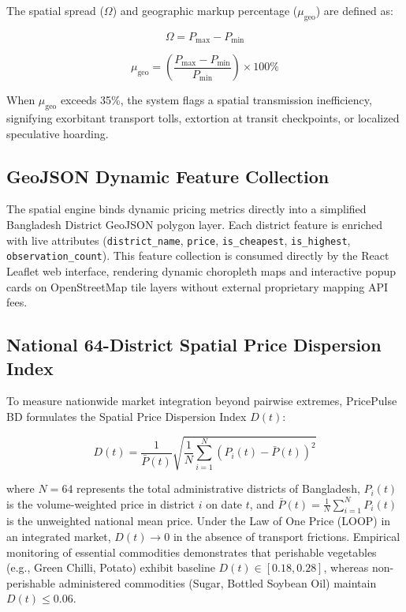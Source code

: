The spatial spread ($\Omega$) and geographic markup percentage ($\mu_{\text{geo}}$) are defined as:

\begin{equation}
\Omega = P_{\max} - P_{\min}
\end{equation}

\begin{equation}
\mu_{\text{geo}} = \left( \frac{P_{\max} - P_{\min}}{P_{\min}} \right) \times 100\%
\end{equation}

When $\mu_{\text{geo}}$ exceeds 35\%, the system flags a spatial transmission inefficiency, signifying exorbitant transport tolls, extortion at transit checkpoints, or localized speculative hoarding.

\subsection{GeoJSON Dynamic Feature Collection}
The spatial engine binds dynamic pricing metrics directly into a simplified Bangladesh District GeoJSON polygon layer. Each district feature is enriched with live attributes (\texttt{district\_name}, \texttt{price}, \texttt{is\_cheapest}, \texttt{is\_highest}, \texttt{observation\_count}). This feature collection is consumed directly by the React Leaflet web interface, rendering dynamic choropleth maps and interactive popup cards on OpenStreetMap tile layers without external proprietary mapping API fees.

\subsection{National 64-District Spatial Price Dispersion Index}
To measure nationwide market integration beyond pairwise extremes, PricePulse BD formulates the Spatial Price Dispersion Index $D(t)$:

\begin{equation}
D(t) = \frac{1}{\bar{P}(t)} \sqrt{\frac{1}{N} \sum_{i=1}^{N} \left( P_i(t) - \bar{P}(t) \right)^2}
\end{equation}

where $N = 64$ represents the total administrative districts of Bangladesh, $P_i(t)$ is the volume-weighted price in district $i$ on date $t$, and $\bar{P}(t) = \frac{1}{N} \sum_{i=1}^{N} P_i(t)$ is the unweighted national mean price. Under the Law of One Price (LOOP) in an integrated market, $D(t) \to 0$ in the absence of transport frictions. Empirical monitoring of essential commodities demonstrates that perishable vegetables (e.g., Green Chilli, Potato) exhibit baseline $D(t) \in [0.18, 0.28]$, whereas non-perishable administered commodities (Sugar, Bottled Soybean Oil) maintain $D(t) \le 0.06$.

